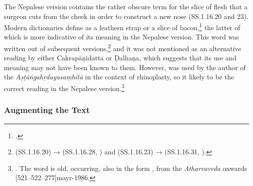 The Nepalese version contains the rather obscure term  for the slice
of flesh that a surgeon cuts from the cheek in order to construct a new nose
(SS.1.16.20 and 23). Modern dictionaries define  as a leathern strap
or a slice of bacon,\footcites[1385]{apte-prac}[917]{moni-sans} the latter of
which is more indicative of its meaning in the Nepalese version. This word was
written out of subsequent versions,\footnote{ (SS.1.16.20) →
     (SS.1.16.28, \cite[81]{vulgate}) and 
    (SS.1.16.23) →  (SS.1.16.31, \cite[81]{vulgate}).} and it was
    not mentioned as an alternative reading by either Cakrapāṇidatta or Ḍalhaṇa, which
    suggests that its use and meaning may not have been known to them. However,
     was used by the author of the \emph{Aṣṭāṅgahṛdayasaṃhitā} in the
    context of rhinoplasty, so it likely to be the correct reading in the Nepalese
    version.\footnote{. The word is old, occurring, also in the
        form , from the \emph{Atharvaveda} onwards
        [521--522--277]{mayr-1986}.}


%

\subsubsection{Augmenting the Text}

